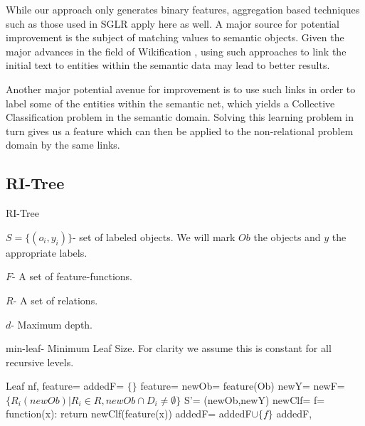 \documentclass{article}
\theoremstyle{definition}
\begin{document}
While our approach only generates binary features, aggregation based techniques such as those used in SGLR apply here as well. A major source for potential improvement is the subject of matching values to semantic objects. Given the major advances in the field of Wikification \citep{bunescu2006using, cheng2013relational}, using such approaches to link the initial text to entities within the semantic data may lead to better results.

Another major potential avenue for improvement is to use such links in order to label some of the entities within the semantic net, which yields a Collective Classification \citep{laorden2012collective, kajdanowicz2013collective} problem in the semantic domain. Solving this learning problem in turn gives us a feature which can then be applied to the non-relational problem domain by the same links.

\begin{appendices}
	\section{RI-Tree} \label{app:2}
	
	\begin{algorithm}[H]
		\caption{RI-Tree}
		\label{code2}
		\small
		$S=\{(o_{i},y_{i})\}$- set of labeled objects. We will mark $Ob$ the objects and $y$ the appropriate labels.
		
		$F$- A set of feature-functions.
		
		$R$- A set of relations.
		
		$d$- Maximum depth.
		
		min-leaf- Minimum Leaf Size. For clarity we assume this is constant for all recursive levels.
		
		\begin{algorithmic}
					\State
					\Return Leaf
				\EndIf
				\State nf, feature= 
				\State {}
				\State
				\Return {}
			\EndFunction
				\State
				\Return {}
			\EndIf
			\State addedF= $\{\}$
				\State feature= 
				\State newOb= feature(Ob)
				\State newY= 
				\State newF= $\{R_{i}(newOb)|R_{i}\in R, newOb\cap D_{i}\neq\emptyset\}$
				\State S'= (newOb,newY)
				\State newClf= 
				\State f= function(x): return newClf(feature(x))
					\State addedF= addedF$\cup \{f\}$
				\EndIf
			\EndWhile
			\State
			\Return addedF, 
			\EndFunction
			
		\end{algorithmic}
	\end{algorithm}
	
\end{appendices}

\clearpage


\end{document}
